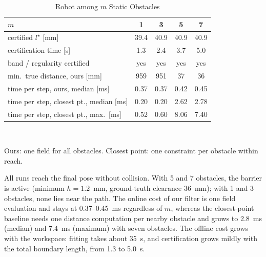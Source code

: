 \documentclass[journal]{IEEEtran}
\theoremstyle{definition}
\begin{document}
\begin{table}[t]
\caption{Robot among $m$ Static Obstacles}
\label{tab:static}
\centering
\footnotesize
\setlength{\tabcolsep}{5pt}
\renewcommand{\arraystretch}{1.05}
\begin{tabular}{lcccc}
\toprule
$m$ & 1 & 3 & 5 & 7\\
\midrule
certified $l^\star$ [mm] & 39.4 & 40.9 & 40.9 & 40.9\\
certification time [s] & 1.3 & 2.4 & 3.7 & 5.0\\
band / regularity certified & yes & yes & yes & yes\\
min.\ true distance, ours [mm] & 959 & 951 & 37 & 36\\
time per step, ours, median [ms] & 0.37 & 0.37 & 0.42 & 0.45\\
time per step, closest pt., median [ms] & 0.20 & 0.20 & 2.62 & 2.78\\
time per step, closest pt., max.\ [ms] & 0.52 & 0.60 & 8.06 & 7.40\\
\bottomrule
\end{tabular}
\\[3pt]
\parbox{\columnwidth}{\footnotesize Ours: one field for all obstacles. Closest point: one
constraint per obstacle within reach.}
\end{table}

All runs reach the final pose without collision. With 5 and 7 obstacles, the barrier is active
(minimum $h=1.2$~mm, ground-truth clearance 36~mm); with 1 and 3 obstacles, none lies near the path.
The online cost of our filter is one field evaluation and stays at 0.37--0.45~ms regardless of $m$,
whereas the closest-point baseline needs one distance computation per nearby obstacle and grows to
2.8~ms (median) and 7.4~ms (maximum) with seven obstacles. The offline cost grows with the workspace:
fitting takes about 35~s, and certification grows mildly with the total boundary length, from 1.3 to
5.0~s.
\end{document}
